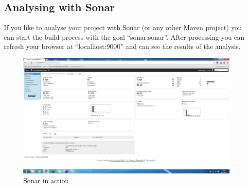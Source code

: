 \subsection{Analysing with Sonar}
If you like to analyse your project with Sonar (or any other Maven project) you can start the build process with the goal "`sonar:sonar"'. After processing you can refresh your browser at "`localhost:9000"' and can see the results of the analysis.

\begin{figure}
	\centering
		\includegraphics[width=\textwidth]{sonarinaction}
	\caption{Sonar in action}
	\label{fig:sonarinaction}
\end{figure}

